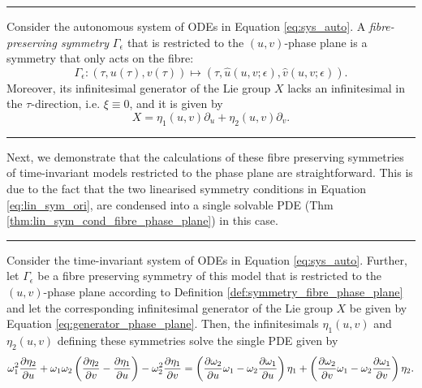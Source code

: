 \hrule
\begin{definition}
Consider the autonomous system of ODEs in Equation \eqref{eq:sys_auto}. A \textit{fibre-preserving symmetry} $\Gamma_\epsilon$ that is restricted to the $(u,v)$-phase plane
is a symmetry that only acts on the fibre:
\begin{equation}
\Gamma_\epsilon:(\tau,u(\tau),v(\tau))\mapsto(\tau,\hat{u}(u,v;\epsilon),\hat{v}(u,v;\epsilon)).
  \label{eq:symmetry_phase_plane}
\end{equation}
Moreover, its infinitesimal generator of the Lie group $X$ lacks an infinitesimal in the $\tau$-direction, i.e. $\xi\equiv 0$, and it is given by
\begin{equation}
X = \eta_1(u,v)\partial_u+\eta_2(u,v)\partial_v.
  \label{eq:generator_phase_plane}
\end{equation}
\label{def:symmetry_fibre_phase_plane}
\end{definition}
\hrule
$\;$\\
\noindent Next, we demonstrate that the calculations of these fibre preserving symmetries of time-invariant models restricted to the phase plane are straightforward. This is due to the fact that the two linearised symmetry conditions in Equation \eqref{eq:lin_sym_ori}, are condensed into a single solvable PDE (Thm \ref{thm:lin_sym_cond_fibre_phase_plane}) in this case. 
\hrule
\begin{theorem}
  Consider the time-invariant system of ODEs in Equation \eqref{eq:sys_auto}. Further, let $\Gamma_\epsilon$ be a fibre preserving symmetry of this model that is restricted to the $(u,v)$-phase plane according to Definition \ref{def:symmetry_fibre_phase_plane} and let the corresponding infinitesimal generator of the Lie group $X$ be given by Equation \eqref{eq:generator_phase_plane}. Then, the infinitesimals $\eta_1(u,v)$ and $\eta_2(u,v)$ defining these symmetries solve the single PDE given by
\begin{equation}
 \omega_1^2 \pdv{\eta_2}{u}+\omega_1\omega_2\left(\pdv{\eta_2}{v}-\pdv{\eta_1}{u}\right)-\omega_2^2\pdv{\eta_1}{v}=\left(\pdv{\omega_2}{u}\omega_1-\omega_2\pdv{\omega_1}{u}\right)\eta_1+\left(\pdv{\omega_2}{v}\omega_1-\omega_2\pdv{\omega_1}{v}\right)\eta_2.
\label{eq:lin_sym_fibre}
\end{equation}

\label{thm:lin_sym_cond_fibre_phase_plane}
\end{theorem}
